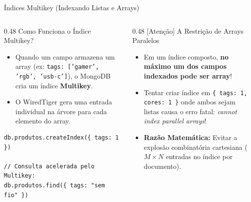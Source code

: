 \begin{frame}[fragile]{Índices Multikey (Indexando Listas e Arrays)}
  \vspace{0.05cm}
  \begin{columns}[t,onlytextwidth]
    \begin{column}{0.48\textwidth}
      \alert{Como Funciona o Índice Multikey?}\par
      \scriptsize
      \begin{itemize}
        \item Quando um campo armazena um array (ex: \texttt{tags: ['gamer', 'rgb', 'usb-c']}), o MongoDB cria um índice \textbf{Multikey}.
        \item O WiredTiger gera uma entrada individual na árvore para cada elemento do array.
      \end{itemize}
      \begin{lstlisting}[language=mongosh]
db.produtos.createIndex({ tags: 1 })

// Consulta acelerada pelo Multikey:
db.produtos.find({ tags: "sem fio" })
      \end{lstlisting}
    \end{column}
    \begin{column}{0.48\textwidth}
      \alert{[Atenção] A Restrição de Arrays Paralelos}\par
      \scriptsize
      \begin{itemize}
        \item Em um índice composto, \textbf{no máximo um dos campos indexados pode ser array}!
        \item Tentar criar índice em \texttt{\{ tags: 1, cores: 1 \}} onde ambos sejam listas causa o erro fatal:
          \textit{cannot index parallel arrays}!
        \item \textbf{Razão Matemática:} Evitar a explosão combinatória cartesiana ($M \times N$ entradas no índice por documento).
      \end{itemize}
    \end{column}
  \end{columns}
\end{frame}

